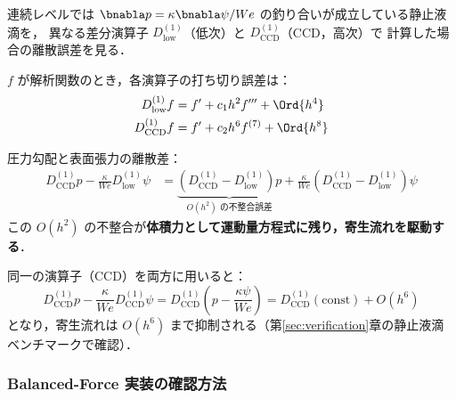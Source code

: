 連続レベルでは $\bnabla p = \kappa\bnabla\psi/We$ の釣り合いが成立している静止液滴を，
異なる差分演算子 $D^{(1)}_{\mathrm{low}}$（低次）と $D^{(1)}_{\mathrm{CCD}}$（CCD，高次）で
計算した場合の離散誤差を見る．

$f$ が解析関数のとき，各演算子の打ち切り誤差は：
\begin{align}
  D^{(1)}_{\mathrm{low}} f   &= f' + c_1 h^2 f''' + \Ord{h^4} \\
  D^{(1)}_{\mathrm{CCD}} f   &= f' + c_2 h^6 f^{(7)} + \Ord{h^8}
\end{align}

圧力勾配と表面張力の離散差：
\begin{align}
  D^{(1)}_{\mathrm{CCD}} p - \frac{\kappa}{We} D^{(1)}_{\mathrm{low}}\psi
  &= \underbrace{\left(D^{(1)}_{\mathrm{CCD}} - D^{(1)}_{\mathrm{low}}\right)p}_{O(h^2) \text{ の不整合誤差}}
  + \frac{\kappa}{We}\left(D^{(1)}_{\mathrm{CCD}} - D^{(1)}_{\mathrm{low}}\right)\psi
\end{align}
この $O(h^2)$ の不整合が\textbf{体積力として運動量方程式に残り，寄生流れを駆動する}．

同一の演算子（CCD）を両方に用いると：
\[
  D^{(1)}_{\mathrm{CCD}} p - \frac{\kappa}{We} D^{(1)}_{\mathrm{CCD}}\psi
  = D^{(1)}_{\mathrm{CCD}}\!\left(p - \frac{\kappa\psi}{We}\right)
  = D^{(1)}_{\mathrm{CCD}}(\text{const}) + O(h^6)
\]
となり，寄生流れは $O(h^6)$ まで抑制される（第\ref{sec:verification}章の静止液滴ベンチマークで確認）．

\subsubsection{Balanced-Force 実装の確認方法}

